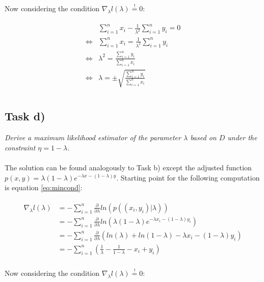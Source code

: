 \documentclass{article}
\begin{document}
Now considering the condition $\nabla_\lambda l(\lambda) \overset{!}{=} 0$:

\begin{align}
\begin{aligned}
& \sum_{i=1}^{n} x_i - \frac{1}{\lambda^2} \sum_{i=1}^{n} y_i = 0 \\
\Leftrightarrow & \sum_{i=1}^{n} x_i = \frac{1}{\lambda^2} \sum_{i=1}^{n} y_i \\
\Leftrightarrow & \lambda^2 = \frac{ \sum_{i=1}^{n} y_i }{\sum_{i=1}^{n} x_i} \\
\Leftrightarrow & \lambda = \pm \sqrt{\frac{ \sum_{i=1}^{n} y_i }{\sum_{i=1}^{n} x_i}} \\
\end{aligned}
\end{align}

\subsection{Task d)}

\textit{Derive a maximum likelihood estimator of the parameter $\lambda$ based on $D$ under the constraint $\eta = 1 - \lambda$.}\\
\\
The solution can be found analogously to Task b) except the adjusted function $p(x, y) = \lambda( 1- \lambda) e ^ {- \lambda x - (1- \lambda) y}$. Starting point for the following computation is equation \ref{eq:mincond}:

\begin{align}
\begin{aligned}
\nabla_\lambda l(\lambda) & = - \sum_{i=1}^{n} \frac{\partial}{\partial \lambda} ln(p((x_i, y_i)|\lambda))\\
					& = - \sum_{i=1}^{n} \frac{\partial}{\partial \lambda} ln(\lambda( 1- \lambda) e ^ {- \lambda x_i - (1- \lambda) y_i})\\
					& = - \sum_{i=1}^{n} \frac{\partial}{\partial \lambda} (ln(\lambda) + ln( 1- \lambda) - \lambda x_i - (1- \lambda) y_i)\\
					& = - \sum_{i=1}^{n} ( \frac{1}{\lambda} - \frac{1}{1- \lambda} - x_i + y_i) \\
\end{aligned}
\end{align}

Now considering the condition $\nabla_\lambda l(\lambda) \overset{!}{=} 0$:
\end{document}
